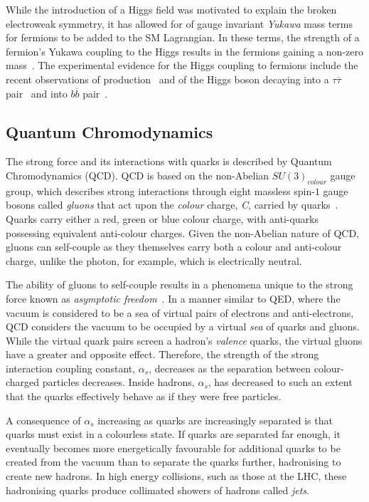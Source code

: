 While the introduction of a Higgs field was motivated to explain the broken electroweak symmetry, it has allowed for of gauge invariant \emph{Yukawa} mass terms for fermions to be added to the SM Lagrangian.
In these terms, the strength of a fermion's Yukawa coupling to the Higgs results in the fermions gaining a non-zero mass~\cite{Cheng:1985bj}.
The experimental evidence for the Higgs coupling to fermions include the recent observations of \ttH production~\cite{Sirunyan:2018hoz} and of the Higgs boson decaying into a $\tau \overline{\tau}$ pair~\cite{CERN-EP-2018-221} and into $b \overline{b}$ pair~\cite{Sirunyan:2017guj}.

\subsection{Quantum Chromodynamics}\label{subsec:QCD}
The strong force and its interactions with quarks is described by Quantum Chromodynamics (QCD).
QCD is based on the non-Abelian $SU(3)_{colour}$ gauge group, which describes strong interactions through eight massless spin-$1$ gauge bosons called \emph{gluons} that act upon the \emph{colour} charge, \emph{C}, carried by quarks~\cite{ElectroweakStrong}.
Quarks carry either a red, green or blue colour charge, with anti-quarks possessing equivalent anti-colour charges.
Given the non-Abelian nature of QCD, gluons can self-couple as they themselves carry both a colour and anti-colour charge, unlike the photon, for example, which is electrically neutral.

The ability of gluons to self-couple results in a phenomena unique to the strong force known as \emph{asymptotic freedom}~\cite{ElectroweakStrong,coughlan2006ideas,devenish2004deep}.
In a manner similar to QED, where the vacuum is considered to be a sea of virtual pairs of electrons and anti-electrons, QCD considers the vacuum to be occupied by a virtual \emph{sea} of quarks and gluons.
While the virtual quark pairs screen a hadron's \emph{valence} quarks, the virtual gluons have a greater and opposite effect. 
Therefore, the strength of the strong interaction coupling constant, $\alpha_{s}$, decreases as the separation between colour-charged particles decreases.
Inside hadrons, $\alpha_{s}$, has decreased to such an extent that the quarks effectively behave as if they were free particles.

A consequence of $\alpha_{s}$ increasing as quarks are increasingly separated is that quarks must exist in a colourless state.
If quarks are separated far enough, it eventually becomes more energetically favourable for additional quarks to be created from the vacuum than to separate the quarks further, hadronising to create new hadrons.
In high energy collisions, such as those at the LHC, these hadronising quarks produce collimated showers of hadrons called \emph{jets}.


